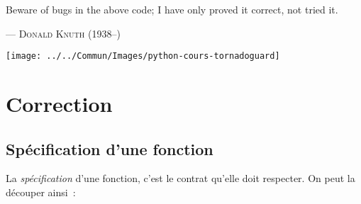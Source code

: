 \documentclass{magnolia}
\begin{document}

\setlength{}
\epigraph{\og Beware of bugs in the above code; I have only proved it correct, not tried it. \fg}{--- \textsc{Donald Knuth (1938--)}}
\hfill\texttt{[image: ../../Commun/Images/python-cours-tornadoguard]}
\magtoc

\section{Correction}
\subsection{Spécification d'une fonction}

La \emph{spécification} d'une fonction, c'est le contrat qu'elle doit respecter.
On peut la découper ainsi~:
\end{document}
